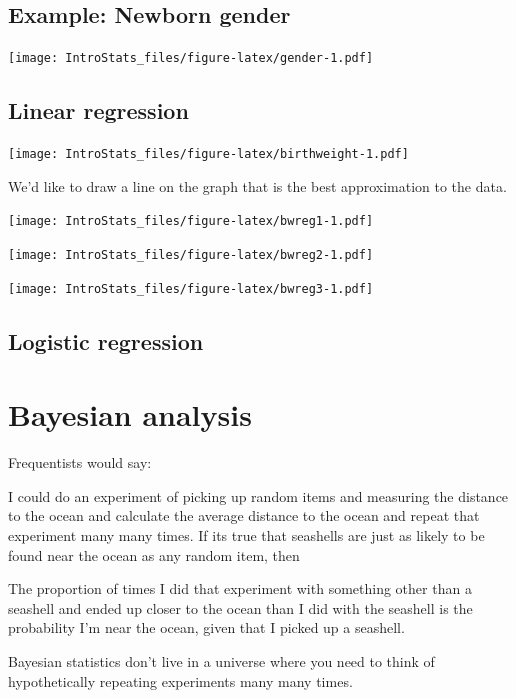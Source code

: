 \documentclass[]{article}
\begin{document}
{{{{{{{{\subsection{Example: Newborn gender}\label{example-newborn-gender}

\texttt{[image: IntroStats\_files/figure-latex/gender-1.pdf]}

\subsection{Linear regression}\label{linear-regression}

\texttt{[image: IntroStats\_files/figure-latex/birthweight-1.pdf]}

We'd like to draw a line on the graph that is the best approximation to
the data.

\texttt{[image: IntroStats\_files/figure-latex/bwreg1-1.pdf]}

\texttt{[image: IntroStats\_files/figure-latex/bwreg2-1.pdf]}

\texttt{[image: IntroStats\_files/figure-latex/bwreg3-1.pdf]}

\subsection{Logistic regression}\label{logistic-regression}

\section{Bayesian analysis}\label{bayesian-analysis}

Frequentists would say:

I could do an experiment of picking up random items and measuring the
distance to the ocean and calculate the average distance to the ocean
and repeat that experiment many many times. If its true that seashells
are just as likely to be found near the ocean as any random item, then

The proportion of times I did that experiment with something other than
a seashell and ended up closer to the ocean than I did with the seashell
is the probability I'm near the ocean, given that I picked up a
seashell.

Bayesian statistics don't live in a universe where you need to think of
hypothetically repeating experiments many many times.

}}}}}}}}
\end{document}
